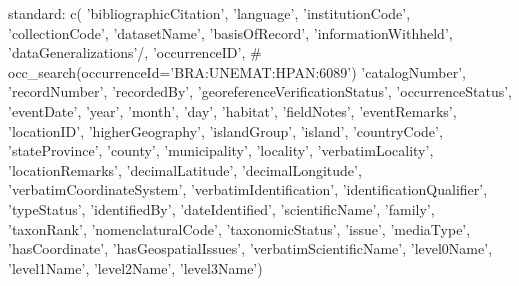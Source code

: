 \documentclass[a4paper]{book}
\begin{document}
\begin{Details}
standard:
c(
'bibliographicCitation',
'language',
'institutionCode',
'collectionCode',
'datasetName',
'basisOfRecord',
'informationWithheld',
'dataGeneralizations'/,
'occurrenceID', \# occ\_search(occurrenceId='BRA:UNEMAT:HPAN:6089')
'catalogNumber',
'recordNumber',
'recordedBy',
'georeferenceVerificationStatus',
'occurrenceStatus',
'eventDate',
'year',
'month',
'day',
'habitat',
'fieldNotes',
'eventRemarks',
'locationID',
'higherGeography',
'islandGroup',
'island',
'countryCode',
'stateProvince',
'county',
'municipality',
'locality',
'verbatimLocality',
'locationRemarks',
'decimalLatitude',
'decimalLongitude',
'verbatimCoordinateSystem',
'verbatimIdentification',
'identificationQualifier',
'typeStatus',
'identifiedBy',
'dateIdentified',
'scientificName',
'family',
'taxonRank',
'nomenclaturalCode',
'taxonomicStatus',
'issue',
'mediaType',
'hasCoordinate',
'hasGeospatialIssues',
'verbatimScientificName',
'level0Name',
'level1Name',
'level2Name',
'level3Name')


\end{Details}
\end{document}
